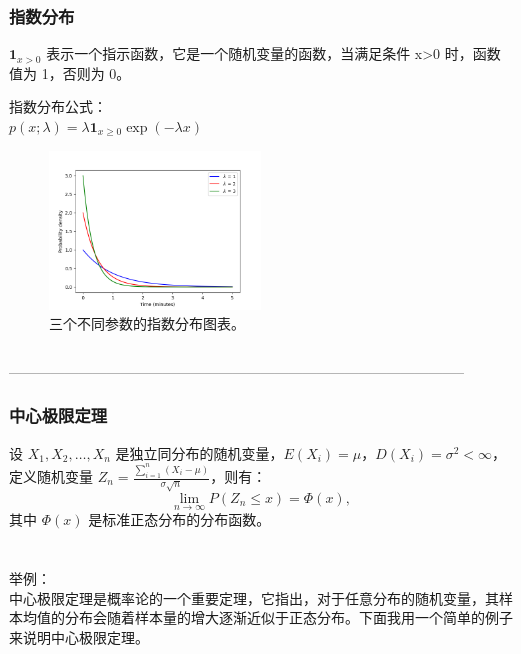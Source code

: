 \documentclass{article}
\begin{document}
\subsubsection{指数分布}
$ \mathbf{1}_{x>0} $ 表示一个指示函数，它是一个随机变量的函数，当满足条件 x>0 时，函数值为 1，否则为 0。

指数分布公式： \\
$ p(x;\lambda) = \lambda \mathbf{1}_{x \geqslant 0} \exp (-\lambda x)$

\begin{figure}[h]
    \centering
    \includegraphics[width=0.5\textwidth]{pic/exponential_distribution.png}
    \caption{三个不同参数的指数分布图表。}
    \label{fig:exp_dist}
\end{figure}



\inputminted[bgcolor=codebgcolor,linenos=true]{python}{pic/exponential_distribution.py}

--------------------------------------------------------------------------------------------------
\subsubsection{中心极限定理}
设 $X_1, X_2, \dots, X_n$ 是独立同分布的随机变量，$E(X_i) = \mu$，$D(X_i) = \sigma^2 < \infty$，定义随机变量 $Z_n = \frac{\sum_{i=1}^{n}(X_i - \mu)}{\sigma \sqrt{n}}$，则有：
$$
\lim_{n\rightarrow\infty}P(Z_n\leq x) = \Phi(x),
$$
其中 $\Phi(x)$ 是标准正态分布的分布函数。
\\\\\\
举例：\\
中心极限定理是概率论的一个重要定理，它指出，对于任意分布的随机变量，其样本均值的分布会随着样本量的增大逐渐近似于正态分布。下面我用一个简单的例子来说明中心极限定理。
\end{document}

